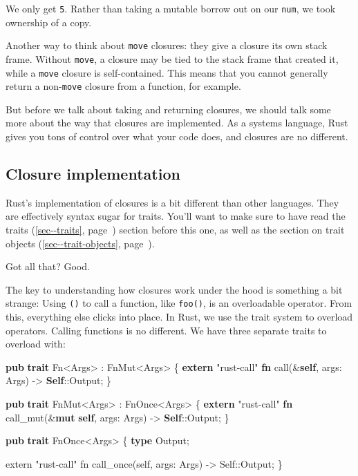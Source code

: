 \documentclass[a4paper,]{book}
\renewcommand*{\hyperref}[2][\ar]{%
  \def\ar{#2}%
  #2 (\autoref{#1}, page~\pageref{#1})}
\newenvironment{Shaded}{\begin{snugshade}}{\end{snugshade}}
\newcommand{\KeywordTok}[1]{\textcolor[rgb]{0.13,0.29,0.53}{\textbf{{#1}}}}
\newcommand{\StringTok}[1]{\textcolor[rgb]{0.31,0.60,0.02}{{#1}}}
\newcommand{\NormalTok}[1]{{#1}}
\begin{document}
We only get \texttt{5}. Rather than taking a mutable borrow out on our
\texttt{num}, we took ownership of a copy.

Another way to think about \texttt{move} closures: they give a closure
its own stack frame. Without \texttt{move}, a closure may be tied to the
stack frame that created it, while a \texttt{move} closure is
self-contained. This means that you cannot generally return a
non-\texttt{move} closure from a function, for example.

But before we talk about taking and returning closures, we should talk
some more about the way that closures are implemented. As a systems
language, Rust gives you tons of control over what your code does, and
closures are no different.

\subsection{Closure implementation}\label{closure-implementation}

Rust's implementation of closures is a bit different than other
languages. They are effectively syntax sugar for traits. You'll want to
make sure to have read the \hyperref[sec--traits]{traits} section before
this one, as well as the section on \hyperref[sec--trait-objects]{trait
objects}.

Got all that? Good.

The key to understanding how closures work under the hood is something a
bit strange: Using \texttt{()} to call a function, like \texttt{foo()},
is an overloadable operator. From this, everything else clicks into
place. In Rust, we use the trait system to overload operators. Calling
functions is no different. We have three separate traits to overload
with:

\begin{Shaded}
\begin{Highlighting}[]
\KeywordTok{pub} \KeywordTok{trait} \NormalTok{Fn<Args> : FnMut<Args> \{}
    \KeywordTok{extern} \StringTok{"rust-call"} \KeywordTok{fn} \NormalTok{call(&}\KeywordTok{self}\NormalTok{, args: Args) -> }\KeywordTok{Self}\NormalTok{::Output;}
\NormalTok{\}}

\KeywordTok{pub} \KeywordTok{trait} \NormalTok{FnMut<Args> : FnOnce<Args> \{}
    \KeywordTok{extern} \StringTok{"rust-call"} \KeywordTok{fn} \NormalTok{call_mut(&}\KeywordTok{mut} \KeywordTok{self}\NormalTok{, args: Args) -> }\KeywordTok{Self}\NormalTok{::Output;}
\NormalTok{\}}

\KeywordTok{pub} \KeywordTok{trait} \NormalTok{FnOnce<Args> \{}
    \KeywordTok{type} \NormalTok{Output;}

    \NormalTok{extern "rust-call" fn call_once(self, args: Args) -> Self::Output;}
\NormalTok{\}}
\end{Highlighting}
\end{Shaded}
\end{document}
